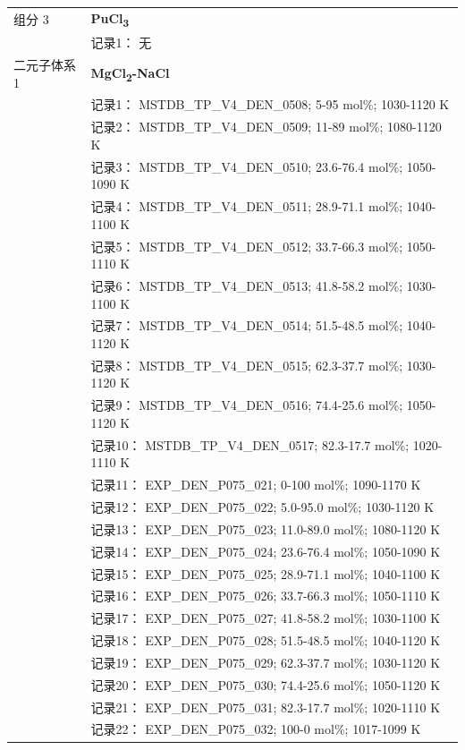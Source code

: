 \documentclass[12pt]{article}
\begin{document}
{\begin{longtable}[]{@{}
  >{\raggedright\arraybackslash}p{}
  >{\raggedright\arraybackslash}p{}@{}}
组分 3 & \textbf{PuCl\textsubscript{3}} \\
 & 记录1： 无 \\
二元子体系 1  & \textbf{MgCl\textsubscript{2}-NaCl} \\
 & 记录1： MSTDB\_TP\_V4\_DEN\_0508; 5-95 mol\%; 1030-1120 K \\
 & 记录2： MSTDB\_TP\_V4\_DEN\_0509; 11-89 mol\%; 1080-1120 K \\
 & 记录3： MSTDB\_TP\_V4\_DEN\_0510; 23.6-76.4 mol\%; 1050-1090 K \\
 & 记录4： MSTDB\_TP\_V4\_DEN\_0511; 28.9-71.1 mol\%; 1040-1100 K \\
 & 记录5： MSTDB\_TP\_V4\_DEN\_0512; 33.7-66.3 mol\%; 1050-1110 K \\
 & 记录6： MSTDB\_TP\_V4\_DEN\_0513; 41.8-58.2 mol\%; 1030-1100 K \\
 & 记录7： MSTDB\_TP\_V4\_DEN\_0514; 51.5-48.5 mol\%; 1040-1120 K \\
 & 记录8： MSTDB\_TP\_V4\_DEN\_0515; 62.3-37.7 mol\%; 1030-1120 K \\
 & 记录9： MSTDB\_TP\_V4\_DEN\_0516; 74.4-25.6 mol\%; 1050-1120 K \\
 & 记录10： MSTDB\_TP\_V4\_DEN\_0517; 82.3-17.7 mol\%; 1020-1110 K \\
 & 记录11： EXP\_DEN\_P075\_021; 0-100 mol\%; 1090-1170 K \\
 & 记录12： EXP\_DEN\_P075\_022; 5.0-95.0 mol\%; 1030-1120 K \\
 & 记录13： EXP\_DEN\_P075\_023; 11.0-89.0 mol\%; 1080-1120 K \\
 & 记录14： EXP\_DEN\_P075\_024; 23.6-76.4 mol\%; 1050-1090 K \\
 & 记录15： EXP\_DEN\_P075\_025; 28.9-71.1 mol\%; 1040-1100 K \\
 & 记录16： EXP\_DEN\_P075\_026; 33.7-66.3 mol\%; 1050-1110 K \\
 & 记录17： EXP\_DEN\_P075\_027; 41.8-58.2 mol\%; 1030-1100 K \\
 & 记录18： EXP\_DEN\_P075\_028; 51.5-48.5 mol\%; 1040-1120 K \\
 & 记录19： EXP\_DEN\_P075\_029; 62.3-37.7 mol\%; 1030-1120 K \\
 & 记录20： EXP\_DEN\_P075\_030; 74.4-25.6 mol\%; 1050-1120 K \\
 & 记录21： EXP\_DEN\_P075\_031; 82.3-17.7 mol\%; 1020-1110 K \\
 & 记录22： EXP\_DEN\_P075\_032; 100-0 mol\%; 1017-1099 K  \\


\end{longtable}}
\end{document}
